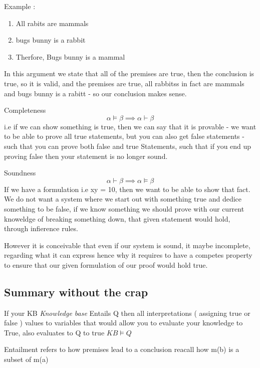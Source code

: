 \documentclass{article}
\theoremstyle{mytheoremstyle}
\theoremstyle{mytheoremstyle}
\theoremstyle{myproblemstyle}
\begin{document}
Example :

\begin{enumerate}
	\item All rabits are mammals
	\item bugs bunny is a rabbit
	\item Therfore, Bugs bunny is a mammal
\end{enumerate}
In this argument we state that all of the premises are true, then the conclusion is true, so it is valid, and the premises are true, all rabbitss in fact are mammals and bugs bunny is a rabitt - so our conclusion makes sense.

\begin{definition}
	Completeness
	\begin{displaymath}
		\alpha \models \beta \implies \alpha \vdash \beta
	\end{displaymath}
	i.e if we can show something is true, then we can say that it is provable - we want to be able to prove all true statements, but you can also get false statements - such that you can prove both false and true Statements, such that if you end up proving false then your statement is no longer sound.
\end{definition}
\newpage

\begin{definition}
	Soundness
	\begin{displaymath}
		\alpha \vdash \beta \implies \alpha \models \beta
	\end{displaymath}
	If we have a formulation i.e xy = 10, then we want to be able to show that fact. We do not want a system where we start out with something true and dedice something to be false, if we know something we should prove with our current knoweldge of breaking something down, that given statement would hold, through infierence rules.

	However it is conceivable that even if our system is sound, it maybe incomplete, regarding what it can express hence why it requires to have a competes property to ensure that our given formulation of our proof would hold true.


\end{definition}


\subsection{Summary without the crap }
If your KB \textit{Knowledge base }Entails Q then all interpretations ( assigning true or false ) values to variables that would allow you to evaluate your knowledge to True, also evaluates to Q to true
\begin{math}
	KB \models Q
\end{math}
\item Entailment refers to how premises lead to a conclusion
reacall how m(b) is a subset of m(a)
\end{document}
